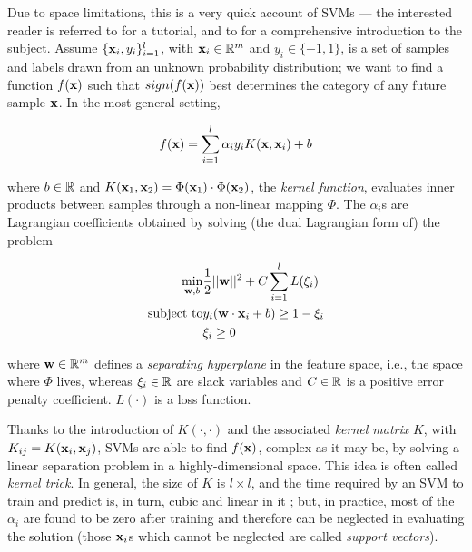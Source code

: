 Due to space limitations, this is a very quick account of SVMs --- the
interested reader is referred to \cite{Burges98} for a tutorial, and
to \cite{Cristianini00} for a comprehensive introduction to the
subject. Assume $\{\mathbf{x}_i,y_i\}_{i=1}^l$, with $\mathbf{x}_i \in \mathbb{R}^m$ and
$y_i \in \{-1,1\}$, is a set of samples and labels drawn from an
unknown probability distribution; we want to find a function $f(\mathbf{x})$
such that $sign(f(\mathbf{x}))$ best determines the category of any future
sample $\mathbf{x}$. In the most general setting,

\begin{equation} \label{eqn:sol}
  f(\mathbf{x}) = \sum_{i=1}^l \alpha_i y_i K(\mathbf{x},\mathbf{x}_i) + b
\end{equation}

\noindent where $b \in \mathbb{R}$ and $K(\mathbf{x}_1,\mathbf{x}_2) = \Phi(\mathbf{x}_1)
\cdot \Phi(\mathbf{x}_2)$, the \emph{kernel function}, evaluates inner
products between samples through a non-linear mapping $\Phi$. The
$\alpha_i$s are Lagrangian coefficients obtained by solving (the dual
Lagrangian form of) the problem

\begin{eqnarray} \label{eqn:svm_primal}
  \min_{\mathbf{w},b}      & \frac{1}{2} ||\mathbf{w}||^2 + C \sum_{i=1}^l L(\xi_i) \\
  \mbox{subject to} & y_i (\mathbf{w}\cdot\mathbf{x}_i + b) \geq 1-\xi_i            \nonumber \\
                    & \xi_i \geq 0                                    \nonumber
\end{eqnarray}

\noindent where $\mathbf{w} \in \mathbb{R}^m$ defines a \emph{separating hyperplane}
in the feature space, i.e., the space where $\Phi$ lives, whereas
$\xi_i \in \mathbb{R}$ are slack variables and $C \in \mathbb{R}$ is a positive
error penalty coefficient. $L(\cdot)$ is a loss function.

Thanks to the introduction of $K(\cdot,\cdot)$ and the associated
\emph{kernel matrix} $K$, with $K_{ij} = K(\mathbf{x}_i,\mathbf{x}_j)$, SVMs are
able to find $f(\mathbf{x})$, complex as it may be, by solving a linear
separation problem in a highly-dimensional space. This idea is often
called \emph{kernel trick}. In general, the size of $K$ is $l \times
l$, and the time required by an SVM to train and predict is, in turn,
cubic and linear in it \cite{KeerthiCDC06}; but, in practice, most of
the $\alpha_i$ are found to be zero after training and therefore can
be neglected in evaluating the solution (those $\mathbf{x}_i$s which cannot
be neglected are called \emph{support vectors}).
